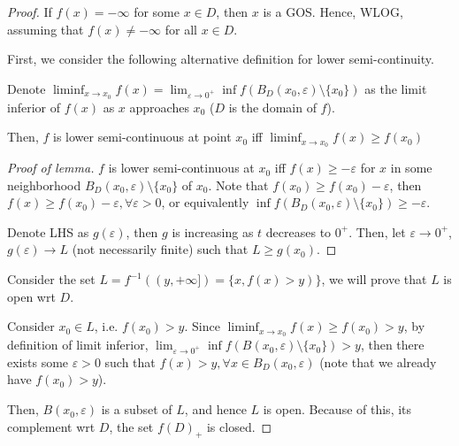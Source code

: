 \begin{proof}

  If \( f(x) = -\infty \) for some \( x \in D \), then \( x \) is a GOS. Hence,
  WLOG, assuming that \( f(x) \neq  -\infty \) for all \( x \in D \).

  First, we consider the following alternative definition for lower
  semi-continuity.

\begin{lemma}
  Denote \( \liminf_{x \to  x_{0}} f(x) = \lim_{\varepsilon \to 0^{+}} \inf f(
  B_{D}(x_{0}, \varepsilon) \setminus \{x_{0}\})    \) as the limit inferior of \(
  f(x) \) as \( x \) approaches \( x_{0} \) (\( D \) is the domain of \( f \)).
  
  Then, \( f \) is lower semi-continuous at point \( x_{0} \) iff \( \liminf_{x \to
  x_{0}} f(x) \ge  f(x_{0}) \)
\end{lemma}

\begin{proof}[Proof of lemma]
  \( f \) is lower semi-continuous at \(
  x_{0} \) iff \( f(x)\ge -\varepsilon \) for \( x \) in some neighborhood \(
  B_{D}(x_{0}, \varepsilon) \setminus \{ x_{0}\}  \) of \( x_{0} \). Note that
  \( f(x_{0}) \ge f(x_{0}) -\varepsilon \), then \( f(x) \ge f(x_{0}) -
  \varepsilon, \forall  \varepsilon > 0 \), or equivalently \( \inf
  f(B_{D}(x_{0}, \varepsilon) \setminus \{x_{0}\}  ) \ge -\varepsilon \).

  Denote LHS as \( g(\varepsilon) \), then \( g \) is increasing as \( t \)
  decreases to \( 0^{+} \). Then, let \( \varepsilon \to  0^{+} \), \(
  g(\varepsilon) \to  L \) (not necessarily finite) such that \( L \ge  g(x_{0})\).
\end{proof}

Consider the set \( L = f^{-1}((y, +\infty]) = \{x, f(x) > y)\}   \), we will prove
that \( L \) is open wrt \( D \).

Consider \( x_{0} \in L \), i.e. \( f(x_{0}) > y \). Since \( \liminf_{x \to
x_{0}} f(x) \ge f(x_{0}) > y \), by definition of limit inferior,
\( \lim_{\varepsilon \to  0^{+}} \inf
f(B(x_{0}, \varepsilon) \setminus \{x_{0}\}) > y   \), then there exists some
\( \varepsilon > 0 \) such that \( f(x) > y, \forall x \in B_{D}(x_{0},
\varepsilon) \) (note that we already have \( f(x_{0}) > y \)).

Then, \( B(x_{0}, \varepsilon) \) is a subset of \( L \), and hence \( L \) is
open. Because of this, its complement wrt \( D \), the set \( f(D)_{+} \) is closed.


\end{proof}

